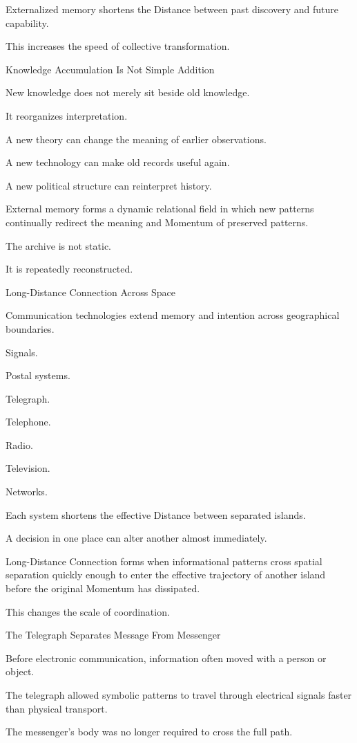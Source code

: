 Externalized memory shortens the Distance between past discovery and future capability.

This increases the speed of collective transformation.

Knowledge Accumulation Is Not Simple Addition

New knowledge does not merely sit beside old knowledge.

It reorganizes interpretation.

A new theory can change the meaning of earlier observations.

A new technology can make old records useful again.

A new political structure can reinterpret history.

External memory forms a dynamic relational field in which new patterns continually redirect the meaning and Momentum of preserved patterns.

The archive is not static.

It is repeatedly reconstructed.

Long-Distance Connection Across Space

Communication technologies extend memory and intention across geographical boundaries.

Signals.

Postal systems.

Telegraph.

Telephone.

Radio.

Television.

Networks.

Each system shortens the effective Distance between separated islands.

A decision in one place can alter another almost immediately.

Long-Distance Connection forms when informational patterns cross spatial separation quickly enough to enter the effective trajectory of another island before the original Momentum has dissipated.

This changes the scale of coordination.

The Telegraph Separates Message From Messenger

Before electronic communication, information often moved with a person or object.

The telegraph allowed symbolic patterns to travel through electrical signals faster than physical transport.

The messenger’s body was no longer required to cross the full path.

